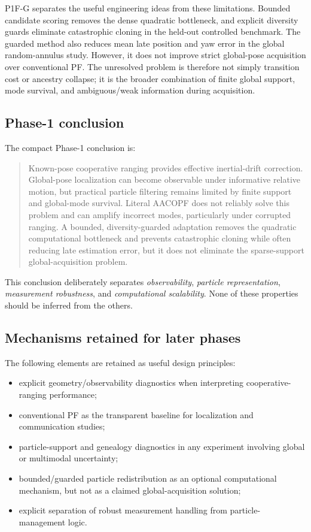 P1F-G separates the useful engineering ideas from these limitations. Bounded candidate scoring removes the dense quadratic bottleneck, and explicit diversity guards eliminate catastrophic cloning in the held-out controlled benchmark. The guarded method also reduces mean late position and yaw error in the global random-annulus study. However, it does not improve strict global-pose acquisition over conventional PF. The unresolved problem is therefore not simply transition cost or ancestry collapse; it is the broader combination of finite global support, mode survival, and ambiguous/weak information during acquisition.

\subsection{Phase-1 conclusion}
The compact Phase-1 conclusion is:
\begin{quote}
Known-pose cooperative ranging provides effective inertial-drift correction. Global-pose localization can become observable under informative relative motion, but practical particle filtering remains limited by finite support and global-mode survival. Literal AACOPF does not reliably solve this problem and can amplify incorrect modes, particularly under corrupted ranging. A bounded, diversity-guarded adaptation removes the quadratic computational bottleneck and prevents catastrophic cloning while often reducing late estimation error, but it does not eliminate the sparse-support global-acquisition problem.
\end{quote}

This conclusion deliberately separates \emph{observability}, \emph{particle representation}, \emph{measurement robustness}, and \emph{computational scalability}. None of these properties should be inferred from the others.

\subsection{Mechanisms retained for later phases}
The following elements are retained as useful design principles:
\begin{itemize}
    \item explicit geometry/observability diagnostics when interpreting cooperative-ranging performance;
    \item conventional PF as the transparent baseline for localization and communication studies;
    \item particle-support and genealogy diagnostics in any experiment involving global or multimodal uncertainty;
    \item bounded/guarded particle redistribution as an optional computational mechanism, but not as a claimed global-acquisition solution;
    \item explicit separation of robust measurement handling from particle-management logic.
\end{itemize}

